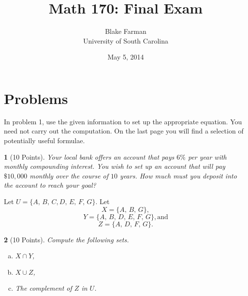 \documentclass[12pt]{amsart}
\author{Blake Farman\\University of South Carolina}
\title{Math 170: Final Exam}
\date{May 5, 2014}
\begin{document}
\maketitle

\begin{center}
\end{center}

\vspace{0.2in}
\vspace{0.2in}

\theoremstyle{plain}
\newtheorem{thm}{}
\newtheorem{lem}{Lemma}
\theoremstyle{definition}
\newtheorem{defn}{Definition}

\section{Problems}

\noindent In problem 1, use the given information to set up the appropriate equation.
You need not carry out the computation.
On the last page you will find a selection of potentially useful formulae.
\begin{thm}[10 Points]\label{ex3}
  Your local bank offers an account that pays $6\%$ per year with monthly compounding interest.
  You wish to set up an account that will pay $\$10,000$ monthly over the course of $10$ years.
  How much must you deposit into the account to reach your goal?
\end{thm}

\newpage

\noindent Let $U = \{A,\, B,\, C, D,\, E,\, F,\, G\}$.
  Let 
  $$X = \{A,\, B,\, G\},$$
  $$Y = \{A,\, B,\, D,\, E,\, F,\, G\}, \text{and}$$
  $$Z = \{A,\, D,\, F,\, G\}.$$
\begin{thm}[10 Points]\label{ex4}
  Compute the following sets.
  \begin{enumerate}[(a)]
  \item
    $X \cap Y$,
    \vspace{1in}
  \item
    $X \cup Z$,
    \vspace{1in}
  \item
    The complement of $Z$ in $U$.
    \vspace{1in}
  \end{enumerate}
\end{thm}
\end{document}

